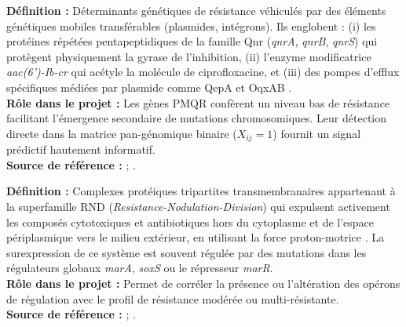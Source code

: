 \documentclass[11pt,a4paper]{article}
\begin{document}
\begin{defbox}
\textbf{Définition :} Déterminants génétiques de résistance véhiculés par des éléments génétiques mobiles transférables (plasmides, intégrons). Ils englobent : (i) les protéines répétées pentapeptidiques de la famille Qnr (\textit{qnrA}, \textit{qnrB}, \textit{qnrS}) qui protègent physiquement la gyrase de l'inhibition, (ii) l'enzyme modificatrice \textit{aac(6')-Ib-cr} qui acétyle la molécule de ciprofloxacine, et (iii) des pompes d'efflux spécifiques médiées par plasmide comme QepA et OqxAB \citep{jacoby2005mechanisms,rodriguezmartinez2016mechanisms}.\\
\textbf{Rôle dans le projet :} Les gènes PMQR confèrent un niveau bas de résistance facilitant l'émergence secondaire de mutations chromosomiques. Leur détection directe dans la matrice pan-génomique binaire ($X_{ij}=1$) fournit un signal prédictif hautement informatif.\\
\textbf{Source de référence :} \citet{jacoby2005mechanisms} ; \citet{rodriguezmartinez2016mechanisms}.
\end{defbox}

\begin{defbox}
\textbf{Définition :} Complexes protéiques tripartites transmembranaires appartenant à la superfamille RND (\textit{Resistance-Nodulation-Division}) qui expulsent activement les composés cytotoxiques et antibiotiques hors du cytoplasme et de l'espace périplasmique vers le milieu extérieur, en utilisant la force proton-motrice \citep{du2018multidrug,nikaido2012efflux}. La surexpression de ce système est souvent régulée par des mutations dans les régulateurs globaux \textit{marA}, \textit{soxS} ou le répresseur \textit{marR}.\\
\textbf{Rôle dans le projet :} Permet de corréler la présence ou l'altération des opérons de régulation avec le profil de résistance modérée ou multi-résistante.\\
\textbf{Source de référence :} \citet{nikaido2012efflux} ; \citet{du2018multidrug}.
\end{defbox}
\end{document}
